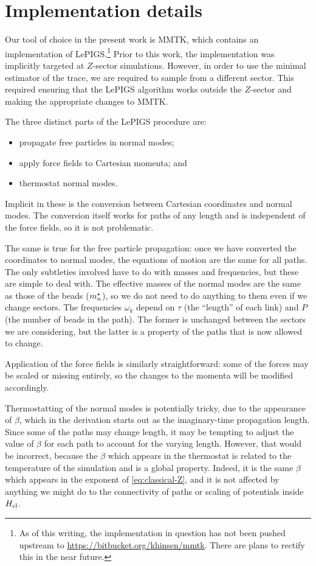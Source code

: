 \section{Implementation details}

Our tool of choice in the present work is MMTK, which contains an implementation of LePIGS.\footnote{
	As of this writing, the implementation in question has not been pushed upstream to \url{https://bitbucket.org/khinsen/mmtk}.
	There are plans to rectify this in the near future.
}
Prior to this work, the implementation was implicitly targeted at $Z$-sector simulations.
However, in order to use the minimal estimator of the trace, we are required to sample from a different sector.
This required ensuring that the LePIGS algorithm works outside the $Z$-sector and making the appropriate changes to MMTK.

The three distinct parts of the LePIGS procedure are:
\begin{itemize}
	\item propagate free particles in normal modes;
	\item apply force fields to Cartesian momenta; and
	\item thermostat normal modes.
\end{itemize}
Implicit in these is the conversion between Cartesian coordinates and normal modes.
The conversion itself works for paths of any length and is independent of the force fields, so it is not problematic.

The same is true for the free particle propagation: once we have converted the coordinates to normal modes, the equations of motion are the same for all paths.
The only subtleties involved have to do with masses and frequencies, but these are simple to deal with.
The effective masses of the normal modes are the same as those of the beads (${m}^\star_n$), so we do not need to do anything to them even if we change sectors.
The frequencies $\omega_k$ depend on $\tau$ (the ``length'' of each link) and $P$ (the number of beads in the path).
The former is unchanged between the sectors we are considering, but the latter is a property of the paths that is now allowed to change.

Application of the force fields is similarly straightforward: some of the forces may be scaled or missing entirely, so the changes to the momenta will be modified accordingly.

Thermostatting of the normal modes is potentially tricky, due to the appearance of $\beta$, which in the derivation starts out as the imaginary-time propagation length.
Since some of the paths may change length, it may be tempting to adjust the value of $\beta$ for each path to account for the varying length.
However, that would be incorrect, because the $\beta$ which appears in the thermostat is related to the temperature of the simulation and is a global property.
Indeed, it is the same $\beta$ which appears in the exponent of \vref{eq:classical-Z}, and it is not affected by anything we might do to the connectivity of paths or scaling of potentials inside $H_\mathrm{cl}$.

